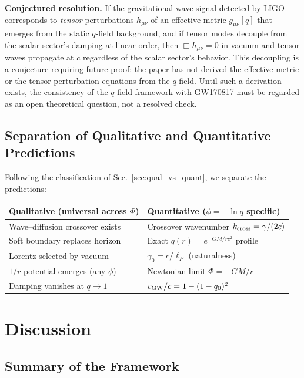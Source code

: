\documentclass[aps,prd,twocolumn,showpacs,superscriptaddress,preprintnumbers]{revtex4-2}
\begin{document}
\textbf{Conjectured resolution.}
If the gravitational wave signal detected by LIGO corresponds to \emph{tensor} perturbations $h_{\mu\nu}$ of an effective metric $g_{\mu\nu}[q]$ that emerges from the static $q$-field background, and if tensor modes decouple from the scalar sector's damping at linear order, then $\Box h_{\mu\nu}=0$ in vacuum and tensor waves propagate at $c$ regardless of the scalar sector's behavior.
This decoupling is a conjecture requiring future proof: the paper has not derived the effective metric or the tensor perturbation equations from the $q$-field.
Until such a derivation exists, the consistency of the $q$-field framework with GW170817 must be regarded as an open theoretical question, not a resolved check.

\subsection{Separation of Qualitative and Quantitative Predictions}

Following the classification of Sec.~\ref{sec:qual_vs_quant}, we separate the predictions:

\begin{center}
\begin{tabular}{p{}p{}}
\toprule
\textbf{Qualitative (universal across $\Phi$)} & \textbf{Quantitative ($\phi=-\ln q$ specific)} \\
\midrule
Wave--diffusion crossover exists & Crossover wavenumber $k_{\rm cross}=\gamma/(2c)$ \\
Soft boundary replaces horizon & Exact $q(r)=e^{-GM/rc^2}$ profile \\
Lorentz selected by vacuum & $\gamma_0=c/\ell_P$ (naturalness) \\
$1/r$ potential emerges (any $\phi$) & Newtonian limit $\Phi=-GM/r$ \\
Damping vanishes at $q\to1$ & $v_{\rm GW}/c = 1-(1-q_0)^2$ \\
\bottomrule
\end{tabular}
\end{center}

\section{Discussion}
\label{sec:discussion}

\subsection{Summary of the Framework}
\end{document}
